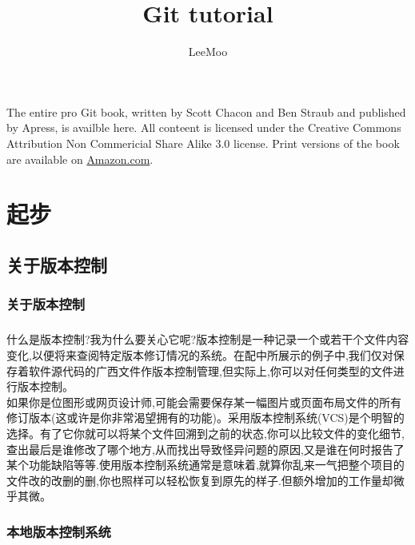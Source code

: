 \documentclass{book}
\title{\Large Git tutorial }
\author{LeeMoo}
\begin{document}
\maketitle
\tableofcontents
\subsection{}
The entire pro Git book, written by Scott Chacon and Ben Straub and published by Apress, is availble here. All conteent is licensed under the Creative Commons Attribution Non Commericial Share Alike 3.0 license. Print versions of the book are available on \href{www.amazon.com}{Amazon.com}.\\

\chapter{起步}
	\section{关于版本控制}
	\subsection{关于版本控制}
	\paragraph{}
	什么是版本控制?我为什么要关心它呢?版本控制是一种记录一个或若干个文件内容变化,以便将来查阅特定版本修订情况的系统。在配中所展示的例子中,我们仅对保存着软件源代码的广西文件作版本控制管理,但实际上,你可以对任何类型的文件进行版本控制。\\
	如果你是位图形或网页设计师,可能会需要保存某一幅图片或页面布局文件的所有修订版本(这或许是你非常渴望拥有的功能)。采用版本控制系统(VCS)是个明智的选择。有了它你就可以将某个文件回溯到之前的状态,你可以比较文件的变化细节,查出最后是谁修改了哪个地方,从而找出导致怪异问题的原因,又是谁在何时报告了某个功能缺陷等等.使用版本控制系统通常是意味着,就算你乱来一气把整个项目的文件改的改删的删,你也照样可以轻松恢复到原先的样子.但额外增加的工作量却微乎其微。\\
	\subsection{本地版本控制系统}
\end{document}
